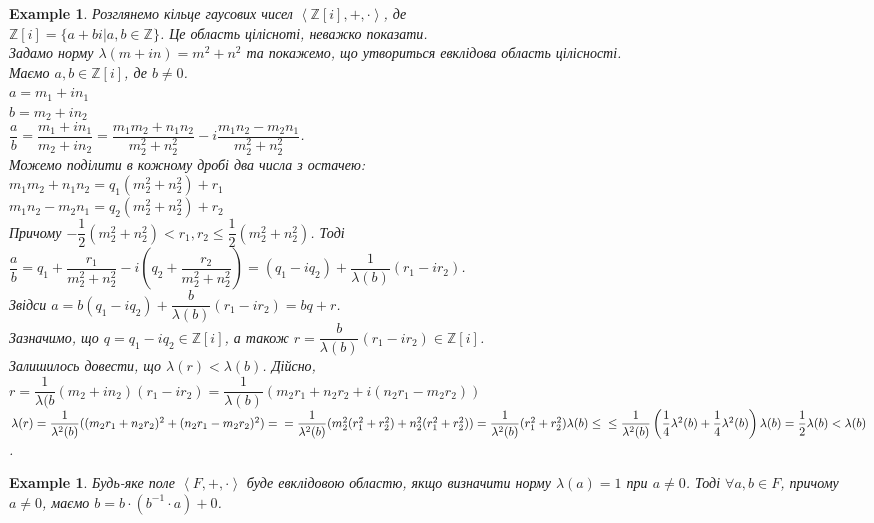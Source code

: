 \documentclass[a4paper, 10pt]{article}
\theoremstyle{theoremdd}
\theoremstyle{theoremdd}
\theoremstyle{theoremdd}
\theoremstyle{theoremdd}
\theoremstyle{theoremdd}
\newtheorem{example}[theorem]{Example}
\theoremstyle{theoremdd}
\theoremstyle{theoremdd}
\theoremstyle{theoremdd}
\theoremstyle{theoremdd}
\theoremstyle{theoremdd}
\theoremstyle{theoremdd}
\theoremstyle{theoremdd}
\theoremstyle{theoremdd}
\theoremstyle{theoremdd}
\theoremstyle{theoremdd}
\begin{document}
\begin{example}
Розглянемо кільце гаусових чисел $\left< \mathbb{Z}[i], +, \cdot \right>$, де\\
$\mathbb{Z}[i] = \{ a+bi | a,b \in \mathbb{Z} \}$. Це область цілісноті, неважко показати.\\
Задамо норму $\lambda(m+in) = m^2 + n^2$ та покажемо, що утвориться евклідова область цілісності.\\
Маємо $a,b \in \mathbb{Z}[i]$, де $b \neq 0$.\\
$a = m_1 + in_1$\\
$b = m_2 + in_2$\\
$\dfrac{a}{b} = \dfrac{m_1+in_1}{m_2+in_2} = \dfrac{m_1m_2+n_1n_2}{m_2^2+n_2^2} - i \dfrac{m_1n_2 - m_2n_1}{m_2^2+n_2^2}$.\\
Можемо поділити в кожному дробі два числа з остачею:\\
$m_1m_2 + n_1n_2 = q_1(m_2^2+n_2^2) + r_1$\\
$m_1n_2 - m_2n_1 = q_2(m_2^2+n_2^2) + r_2$\\
Причому $-\dfrac{1}{2} (m_2^2+n_2^2) < r_1,r_2 \leq \dfrac{1}{2}(m_2^2+n_2^2)$. Тоді\\
$\dfrac{a}{b} = q_1 + \dfrac{r_1}{m_2^2 + n_2^2} - i \left( q_2 + \dfrac{r_2}{m_2^2+n_2^2} \right) = (q_1-iq_2) + \dfrac{1}{\lambda(b)}(r_1-ir_2)$.\\
Звідси $a = b(q_1-iq_2) + \dfrac{b}{\lambda(b)}(r_1-ir_2) = bq + r$.\\
Зазначимо, що $q = q_1-iq_2 \in \mathbb{Z}[i]$, а також $r = \dfrac{b}{\lambda(b)}(r_1-ir_2) \in \mathbb{Z}[i]$.\\
Залишилось довести, що $\lambda(r) < \lambda(b)$. Дійсно,\\
$r = \dfrac{1}{\lambda(b}(m_2+in_2)(r_1-ir_2) = \dfrac{1}{\lambda(b)}(m_2r_1+n_2r_2 + i(n_2r_1 - m_2r_2))$\\
$\lambda(r) = \dfrac{1}{\lambda^2(b)} ((m_2r_1+n_2r_2)^2 + (n_2r_1-m_2r_2)^2) = \\
= \dfrac{1}{\lambda^2(b)} (m_2^2(r_1^2+r_2^2) + n_2^2(r_1^2+r_2^2)) = \dfrac{1}{\lambda^2(b)} (r_1^2+r_2^2) \lambda(b) \leq \\ \leq \dfrac{1}{\lambda^2(b)} \left( \dfrac{1}{4}\lambda^2(b) + \dfrac{1}{4} \lambda^2(b) \right) \lambda(b) = \dfrac{1}{2} \lambda(b) < \lambda(b)$.
\end{example}

\begin{example}
Будь-яке поле $\left< F,+,\cdot\right>$ буде евклідовою областю, якщо визначити норму $\lambda(a) = 1$ при $a \neq 0$. Тоді $\forall a,b \in F$, причому $a \neq 0$, маємо $b = b \cdot (b^{-1} \cdot a) + 0$.
\end{example}
\end{document}
